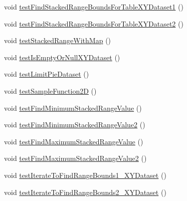 \begin{DoxyCompactItemize}
\item 
void \mbox{\hyperlink{classorg_1_1jfree_1_1data_1_1general_1_1_dataset_utilities_test_a8ca7e2a2eed8be326032f89b7b400547}{test\+Find\+Stacked\+Range\+Bounds\+For\+Table\+X\+Y\+Dataset1}} ()
\item 
void \mbox{\hyperlink{classorg_1_1jfree_1_1data_1_1general_1_1_dataset_utilities_test_ad94bdfebc0ea314db673dc2f1932c5c5}{test\+Find\+Stacked\+Range\+Bounds\+For\+Table\+X\+Y\+Dataset2}} ()
\item 
void \mbox{\hyperlink{classorg_1_1jfree_1_1data_1_1general_1_1_dataset_utilities_test_aba00990442605d22d713bb80cd42732e}{test\+Stacked\+Range\+With\+Map}} ()
\item 
void \mbox{\hyperlink{classorg_1_1jfree_1_1data_1_1general_1_1_dataset_utilities_test_a05ed395853f0978a6c56ae55a8fa4137}{test\+Is\+Empty\+Or\+Null\+X\+Y\+Dataset}} ()
\item 
void \mbox{\hyperlink{classorg_1_1jfree_1_1data_1_1general_1_1_dataset_utilities_test_a5590ca9a19d142d94f847a9c614903ce}{test\+Limit\+Pie\+Dataset}} ()
\item 
void \mbox{\hyperlink{classorg_1_1jfree_1_1data_1_1general_1_1_dataset_utilities_test_ae421f414606a0cfde8e350d7d8c09374}{test\+Sample\+Function2D}} ()
\item 
void \mbox{\hyperlink{classorg_1_1jfree_1_1data_1_1general_1_1_dataset_utilities_test_ae532c1727b6803afb93fbdf5adf28415}{test\+Find\+Minimum\+Stacked\+Range\+Value}} ()
\item 
void \mbox{\hyperlink{classorg_1_1jfree_1_1data_1_1general_1_1_dataset_utilities_test_abb4d6b10491d12a214ec9ed6dd8d015e}{test\+Find\+Minimum\+Stacked\+Range\+Value2}} ()
\item 
void \mbox{\hyperlink{classorg_1_1jfree_1_1data_1_1general_1_1_dataset_utilities_test_ae7d8c581bc0cdce379a07e43db57d845}{test\+Find\+Maximum\+Stacked\+Range\+Value}} ()
\item 
void \mbox{\hyperlink{classorg_1_1jfree_1_1data_1_1general_1_1_dataset_utilities_test_af63f479b769df7206b106641829db03c}{test\+Find\+Maximum\+Stacked\+Range\+Value2}} ()
\item 
void \mbox{\hyperlink{classorg_1_1jfree_1_1data_1_1general_1_1_dataset_utilities_test_a461719eb1a70d3ca61dfd57dfa91255d}{test\+Iterate\+To\+Find\+Range\+Bounds1\+\_\+\+X\+Y\+Dataset}} ()
\item 
void \mbox{\hyperlink{classorg_1_1jfree_1_1data_1_1general_1_1_dataset_utilities_test_a019bbd5e8ac54223fcb9f667d1fe4b95}{test\+Iterate\+To\+Find\+Range\+Bounds2\+\_\+\+X\+Y\+Dataset}} ()

\end{DoxyCompactItemize}
